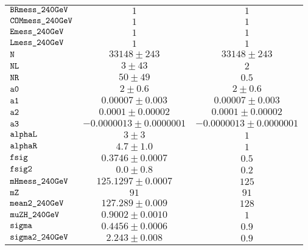 \begin{tabular}{lcc}
$\verb+BRmess_240GeV+ $ & $  1$ & $ 1$\\
$\verb+COMmess_240GeV+ $ & $  1$ & $ 1$\\
$\verb+Emess_240GeV+ $ & $  1$ & $ 1$\\
$\verb+Lmess_240GeV+ $ & $  1$ & $ 1$\\
$\verb+N+ $ & $  33148\pm 243$ & $ 33148\pm 243$\\
$\verb+NL+ $ & $  3\pm 43$ & $ 2$\\
$\verb+NR+ $ & $  50\pm 49$ & $ 0.5$\\
$\verb+a0+ $ & $  2\pm 0.6$ & $ 2\pm 0.6$\\
$\verb+a1+ $ & $  0.00007\pm 0.003$ & $ 0.00007\pm 0.003$\\
$\verb+a2+ $ & $  0.0001\pm 0.00002$ & $ 0.0001\pm 0.00002$\\
$\verb+a3+ $ & $ -0.0000013\pm 0.0000001$ & $-0.0000013\pm 0.0000001$\\
$\verb+alphaL+ $ & $  3\pm 3$ & $ 1$\\
$\verb+alphaR+ $ & $  4.7\pm 1.0$ & $ 1$\\
$\verb+fsig+ $ & $  0.3746\pm 0.0007$ & $ 0.5$\\
$\verb+fsig2+ $ & $  0.0\pm 0.8$ & $ 0.2$\\
$\verb+mHmess_240GeV+ $ & $  125.1297\pm 0.0007$ & $ 125$\\
$\verb+mZ+ $ & $  91$ & $ 91$\\
$\verb+mean2_240GeV+ $ & $  127.289\pm 0.009$ & $ 128$\\
$\verb+muZH_240GeV+ $ & $  0.9002\pm 0.0010$ & $ 1$\\
$\verb+sigma+ $ & $  0.4456\pm 0.0006$ & $ 0.9$\\
$\verb+sigma2_240GeV+ $ & $  2.243\pm 0.008$ & $ 0.9$\\
\end{tabular}
